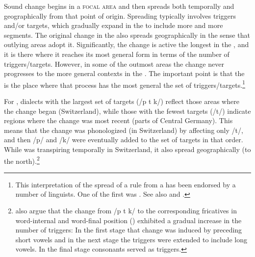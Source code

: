 \begin{xlist}
\begin{xlist}
Sound change begins in a \textsc{focal} \textsc{area} \citep[440]{Hock1986} and then spreads both temporally and geographically from that point of origin. Spreading typically involves triggers and/or targets, which gradually expand in the  to include more and more segments. The original change in the  also spreads geographically in the sense that outlying areas adopt it. Significantly, the change is active the longest in the , and it is there where it reaches its most general form in terms of the number of triggers/targets. However, in some of the outmost areas the change never progresses to the more general contexts in the . The important point is that the  is the place where that process has the most general the set of triggers/targets.\footnote{This interpretation of the spread of a rule from a  has been endorsed by a number of linguists. One of the first was \citet[61f.]{Schuchardt1885}. See also \citet[345]{RobinsonCoetsem1973} and \citet[393--394]{Kiparsky1988}.}

For , dialects with the largest set of targets (/p t k/) reflect those areas where the change began (Switzerland), while those with the fewest targets (/t/) indicate regions where the change was most recent (parts of Central Germany). This means that the change was phonologized (in Switzerland) by affecting only /t/, and then /p/ and /k/ were eventually added to the set of targets in that order. While  was transpiring temporally in Switzerland, it also spread geographically (to the north).\footnote{\citet{DavisSalmons1999} also argue that the change from /p t k/ to the corresponding fricatives in word-internal and word-final position () exhibited a gradual increase in the number of triggers: In the first stage that change was induced by preceding short vowels and in the next stage the triggers were extended to include long vowels. In the final stage consonants served as triggers.}


\end{xlist}
\end{xlist}
